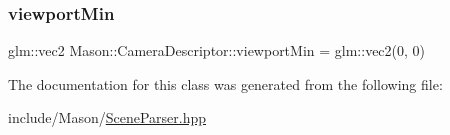 \hypertarget{class_mason_1_1_camera_descriptor_a2d135d0102e435f15cf6a9dde7d64b25}{}\label{class_mason_1_1_camera_descriptor_a2d135d0102e435f15cf6a9dde7d64b25} 
\subsubsection{\texorpdfstring{viewport\+Min}{viewportMin}}
{\footnotesize\ttfamily glm\+::vec2 Mason\+::\+Camera\+Descriptor\+::viewport\+Min = glm\+::vec2(0, 0)}



The documentation for this class was generated from the following file\+:\begin{DoxyCompactItemize}
\item 
include/\+Mason/\hyperlink{_scene_parser_8hpp}{Scene\+Parser.\+hpp}\end{DoxyCompactItemize}
